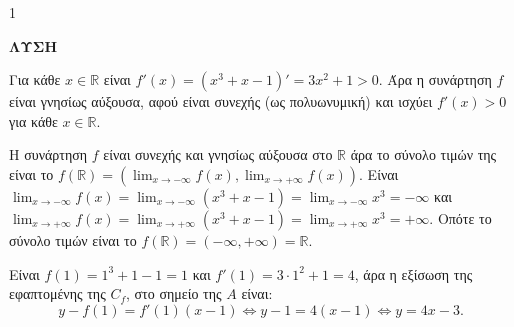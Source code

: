 \begin{ylh}{1}
    \item [Ύλη από εικόνα]
\end{ylh}
\textbf{ΛΥΣΗ}
\begin{alist}
\item Για κάθε $x \in \mathbb{R}$ είναι $f'(x)=(x^3+x-1)' = 3x^2+1>0$. Άρα η συνάρτηση $f$ είναι γνησίως αύξουσα, αφού είναι συνεχής (ως πολυωνυμική) και ισχύει $f'(x)>0$ για κάθε $x \in \mathbb{R}$.
\item Η συνάρτηση $f$ είναι συνεχής και γνησίως αύξουσα στο $\mathbb{R}$ άρα το σύνολο τιμών της είναι το $f(\mathbb{R})=\left(\lim_{x \to -\infty} f(x), \lim_{x \to +\infty} f(x)\right)$.
Είναι
$\lim_{x \to -\infty} f(x) = \lim_{x \to -\infty} (x^3+x-1) = \lim_{x \to -\infty} x^3 = -\infty$ και $\lim_{x \to +\infty} f(x) = \lim_{x \to +\infty} (x^3+x-1) = \lim_{x \to +\infty} x^3 = +\infty$.
Οπότε το σύνολο τιμών είναι το $f(\mathbb{R})=(-\infty, +\infty)=\mathbb{R}$.
\item Είναι $f(1)=1^3+1-1=1$ και $f'(1)=3 \cdot 1^2+1=4$, άρα η εξίσωση της εφαπτομένης της $C_f$, στο σημείο της $A$ είναι:
\[ y-f(1)=f'(1)(x-1) \Leftrightarrow y-1=4(x-1) \Leftrightarrow y=4x-3. \]
\end{alist}